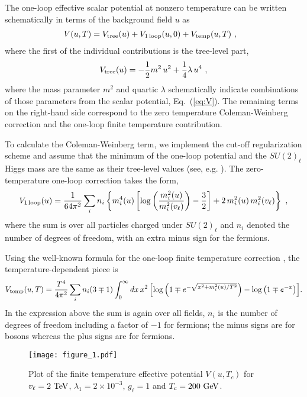 \documentclass[prd,showpcs,amsmath,amssymb,nofootinbib,preprintnumbers,balancelastpage,longbibliography,superscriptaddress,notitlepage]{revtex4}
\def\bea{\begin{eqnarray}}
\def\eea{\end{eqnarray}}
\def\bea{\begin{eqnarray}}
\def\eea{\end{eqnarray}}
\begin{document}
The one-loop effective scalar potential at nonzero temperature can be written schematically in terms of the background field $u$ as
\bea
\hspace{-3mm}V(u, T) = V_{\rm tree}(u) + V_{{\rm 1\,loop}}(u, 0) + V_{\rm temp}(u, T) \ ,
\label{eff_pot}
\eea
where the first of the individual contributions is the tree-level part, 
\bea
V_{\rm tree}(u) = -\frac{1}{2} m^2 \,u^2 + \frac{1}{4} \lambda \, u^4 \ ,
\eea
where the mass parameter $m^2$ and quartic $\lambda$ schematically indicate combinations of those parameters from
the scalar potential, Eq.~(\ref{eq:V}).  The remaining terms on the right-hand side correspond to
the zero temperature Coleman-Weinberg correction and the one-loop finite temperature contribution. 

To calculate the Coleman-Weinberg term, 
we implement the cut-off regularization scheme and assume that the minimum of the one-loop potential and the $SU(2)_\ell$ Higgs mass are the same as their tree-level values (see, e.g. \cite{Quiros:1999jp}). The zero-temperature one-loop correction takes the form,
\bea
V_{1\,{\rm loop}}(u)  = \frac{1}{64\pi^2} \sum_i n_i \left\{m_i^4(u)\left[\log\left(\frac{m_i^2(u)}{m_i^2(v_\ell)}\right)-\frac{3}{2}\right]+2\,m_i^2(u)\,m_i^2(v_\ell)\right\} \ ,
\eea
where the sum is over all particles charged under $SU(2)_\ell$ and $n_i$ denoted the number of degrees of freedom, with an extra minus sign for the fermions.

Using the well-known formula for the one-loop finite temperature correction \cite{Quiros:1999jp},  the temperature-dependent piece is
\bea
V_{\rm temp}(u, T) = \frac{T^4}{4 \pi^2}\sum_i n_i (3\mp 1)\int_0^\infty d x \, x^2 \left[\log\left(1\mp e^{-\sqrt{x^2+ m_i^2(u)/T^2}}\right) - \log\left(1\mp e^{-x}\right)\right]\!.
\eea
In the expression above the sum is again over all fields, $n_i$ is the number of degrees of freedom including a factor of $-1$ for fermions; the minus signs are for bosons whereas the plus signs are for fermions.

\begin{figure}[t!]
\texttt{[image: figure\_1.pdf]} \vspace{-7mm}
\caption{
\small{Plot of the finite temperature effective potential $V(u, T_c)$ for $v_\ell = 2 \ \rm TeV$, $\lambda_{1} = 2\times 10^{-3}$, $g_\ell = 1$ and $T_c=200 \ \rm GeV$.}}
\label{fig:finite_temp}
\end{figure}
\end{document}
